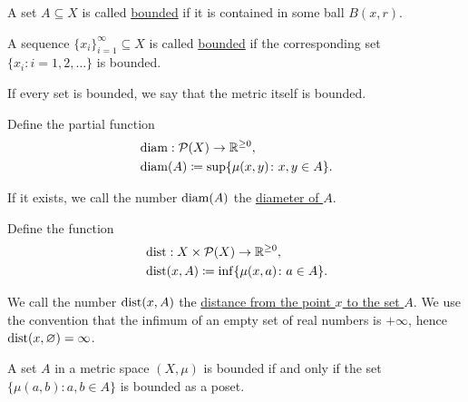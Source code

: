 \begin{definition}
\begin{defenum}
    \item\label{def:metric_space/bounded_set} A set $A \subseteq X$ is called \ul{bounded} if it is contained in some ball $B(x, r)$.

    \item\label{def:metric_space/bounded_sequence} A sequence $\{ x_i \}_{i=1}^\infty \subseteq X$ is called \ul{bounded} if the corresponding set $\{ x_i \colon i = 1, 2, \ldots \}$ is bounded.

    \item\label{def:metric_space/bounded_metric} If every set is bounded, we say that the metric itself is bounded.

    \item\label{def:metric_space/diameter} Define the partial function
    \begin{align*}
      &\operatorname{diam}: \operatorname{\mathcal P}(X) \to \mathbb R^{\geq 0}, \\
      &\operatorname{diam}(A) \coloneqq \sup \{ \mu(x, y) \colon x, y \in A \}.
    \end{align*}

    If it exists, we call the number $\operatorname{diam}(A)$ the \ul{diameter of $A$}.

    \item\label{def:metric_space/distance} Define the function
    \begin{align*}
      &\operatorname{dist}: X \times \operatorname{\mathcal P}(X) \to \mathbb R^{\geq 0}, \\
      &\operatorname{dist}(x, A) \coloneqq \inf \{ \mu(x, a) \colon a \in A \}.
    \end{align*}

    We call the number $\operatorname{dist}(x, A)$ the \ul{distance from the point $x$ to the set $A$}. We use the convention that the infimum of an empty set of real numbers is $+\infty$, hence $\operatorname{dist}(x, \varnothing) = \infty$.
  \end{defenum}
\end{definition}

\begin{note}\label{note:bounded_set_metric_order_equivalence}
  A set $A$ in a metric space $(X, \mu)$ is bounded if and only if the set $\{ \mu(a, b) \colon a, b \in A \}$ is bounded as a poset.
\end{note}

